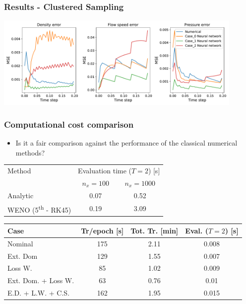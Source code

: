 \documentclass[aspectratio=169]{beamer}
\begin{document}
\begin{frame}\frametitle{Results - Clustered Sampling}
	
	\begin{center}
		\includegraphics[width=0.9\textwidth]{Figures/Figure_11.pdf}
	\end{center}
	
\end{frame}


\begin{frame}\frametitle{Computational cost comparison}
	
	\begin{itemize}
		\item Is it a fair comparison against the performance of the classical numerical methods?
	\end{itemize}
	

	\begin{table}
		\centering
		\begin{tabular}{lcc}
			\hline
			\textcolor{myOrange}{Method} & \multicolumn{2}{c}{ \textcolor{myOrange}{Evaluation time ($T=2$) [s]}}    \\
						& $n_x = 100$		& $n_x = 1000$ \\		
			\hline
			Analytic	& 0.07 & 0.52 \\
			WENO (5\textsuperscript{th} - RK45) &	0.19  & 3.09 \\
			\hline						
		\end{tabular}				
	\end{table}

	
	\begin{table}
		\centering
		\begin{tabular}{lccc}
			\hline
			\textcolor{myOrange}{Case} & \textcolor{myOrange}{Tr/epoch [s]} & \textcolor{myOrange}{Tot. Tr. [min]} & \textcolor{myOrange}{Eval. ($T=2$) [s]} \\
			\hline
			Nominal	& 175  & 2.11 &  0.008\\
			Ext. Dom  & 129  & 1.55  &	0.007		\\
			Loss W.		& 85 & 1.02 & 0.009			\\
			Ext. Dom. + Loss W.	& 63  & 0.76  & 0.01 \\
			E.D. + L.W. + C.S.	& 162  & 1.95 & 0.015 \\
			\hline						
		\end{tabular}				
	\end{table}

	
\end{frame}
\end{document}
